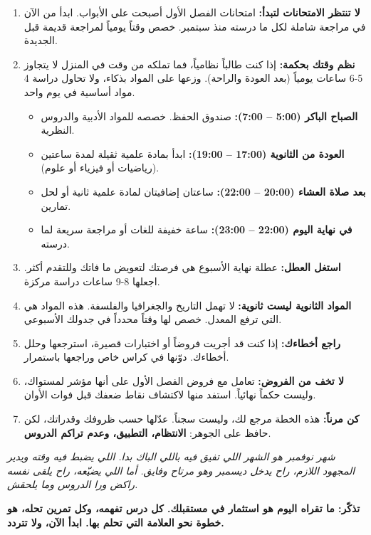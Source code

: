 \documentclass[12pt,a4paper]{book}
\newcommand{\quoteAr}[1]{%
	\begin{myquote}
		\itshape #1
	\end{myquote}
}
\newcommand{\importantAr}[1]{%
	\begin{important}
		\bfseries #1
	\end{important}
}
\begin{document}
	\begin{enumerate}
		\item \textbf{لا تنتظر الامتحانات لتبدأ:} امتحانات الفصل الأول أصبحت على الأبواب. ابدأ من الآن في مراجعة شاملة لكل ما درسته منذ سبتمبر. خصص وقتاً يومياً لمراجعة قديمة قبل الجديدة.
		\item \textbf{نظم وقتك بحكمة:} إذا كنت طالباً نظامياً، فما تملكه من وقت في المنزل لا يتجاوز 5-6 ساعات يومياً (بعد العودة والراحة). وزعها على المواد بذكاء، ولا تحاول دراسة 4 مواد أساسية في يوم واحد. 
		\begin{itemize}
			\item \textbf{الصباح الباكر (5:00 – 7:00):} صندوق الحفظ. خصصه للمواد الأدبية والدروس النظرية.
			\item \textbf{العودة من الثانوية (17:00 – 19:00):} ابدأ بمادة علمية ثقيلة لمدة ساعتين (رياضيات أو فيزياء أو علوم).
			\item \textbf{بعد صلاة العشاء (20:00 – 22:00):} ساعتان إضافيتان لمادة علمية ثانية أو لحل تمارين.
			\item \textbf{في نهاية اليوم (22:00 – 23:00):} ساعة خفيفة للغات أو مراجعة سريعة لما درسته.
		\end{itemize}
		\item \textbf{استغل العطل:} عطلة نهاية الأسبوع هي فرصتك لتعويض ما فاتك وللتقدم أكثر. اجعلها 8-9 ساعات دراسة مركزة.
		\item \textbf{المواد الثانوية ليست ثانوية:} لا تهمل التاريخ والجغرافيا والفلسفة. هذه المواد هي التي ترفع المعدل. خصص لها وقتاً محدداً في جدولك الأسبوعي.
		\item \textbf{راجع أخطاءك:} إذا كنت قد أجريت فروضاً أو اختبارات قصيرة، استرجعها وحلل أخطاءك. دوّنها في كراس خاص وراجعها باستمرار.
		\item \textbf{لا تخف من الفروض:} تعامل مع فروض الفصل الأول على أنها مؤشر لمستواك، وليست حكماً نهائياً. استفد منها لاكتشاف نقاط ضعفك قبل فوات الأوان.
		\item \textbf{كن مرناً:} هذه الخطة مرجع لك، وليست سجناً. عدّلها حسب ظروفك وقدراتك، لكن حافظ على الجوهر: \textbf{الانتظام، التطبيق، وعدم تراكم الدروس}.
	\end{enumerate}
	
	\quoteAr{شهر نوفمبر هو الشهر اللي تفيق فيه باللي الباك بدا. اللي يضبط فيه وقته ويدير المجهود اللازم، راح يدخل ديسمبر وهو مرتاح وفايق. أما اللي يضيّعه، راح يلقى نفسه راكض ورا الدروس وما يلحقش.}
	
	\importantAr{تذكّر: ما تقراه اليوم هو استثمار في مستقبلك. كل درس تفهمه، وكل تمرين تحله، هو خطوة نحو العلامة التي تحلم بها. ابدأ الآن، ولا تتردد.}
	
\end{document}
